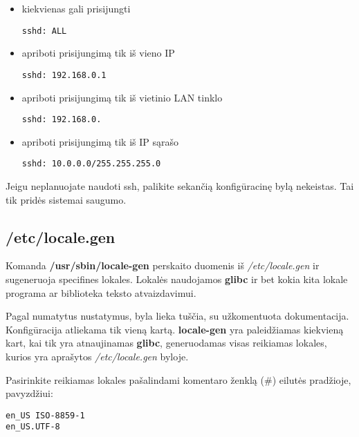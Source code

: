   \begin{itemize}
    \item kiekvienas gali prisijungti

      \begin{verbatim}
sshd: ALL
      \end{verbatim}

    \item apriboti prisijungimą tik iš vieno IP

      \begin{verbatim}
sshd: 192.168.0.1
      \end{verbatim}

    \item apriboti prisijungimą tik iš vietinio LAN tinklo

      \begin{verbatim}
sshd: 192.168.0.
      \end{verbatim}

    \item apriboti prisijungimą tik iš IP sąrašo

      \begin{verbatim}
sshd: 10.0.0.0/255.255.255.0
      \end{verbatim}
  \end{itemize}

  Jeigu neplanuojate naudoti ssh, palikite sekančią konfigūracinę bylą
  nekeistas. Tai tik pridės sistemai saugumo.

\subsection{/etc/locale.gen}

  Komanda \textbf{/usr/sbin/locale-gen} perskaito duomenis iš
  \textsl{/etc/locale.gen} ir sugeneruoja specifines lokales. Lokalės
  naudojamos \textbf{glibc} ir bet kokia kita lokale programa ar
  biblioteka teksto atvaizdavimui.

  Pagal numatytus nustatymus, byla lieka tuščia, su užkomentuota
  dokumentacija. Konfigūracija atliekama tik vieną
  kartą. \textbf{locale-gen} yra paleidžiamas kiekvieną kart, kai tik
  yra atnaujinamas \textbf{glibc}, generuodamas visas reikiamas
  lokales, kurios yra aprašytos \textsl{/etc/locale.gen} byloje. 

  Pasirinkite reikiamas lokales pašalindami komentaro ženklą ($\#$)
  eilutės pradžioje, pavyzdžiui:

  \begin{verbatim}
en_US ISO-8859-1
en_US.UTF-8
  \end{verbatim}
  

